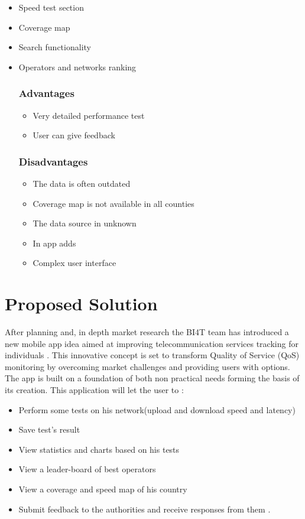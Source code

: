 \begin{itemize}
    \renewcommand\labelitemi{\textbf{\Huge .}}
    \item  Speed test section
    \item Coverage map 
    \item Search functionality 
    \item Operators and networks ranking
  
\subsubsection*{Advantages}
\begin{itemize}
\renewcommand\labelitemi{\textbf{\Huge .}}
    \item Very detailed performance test
    \item User can give feedback
\end{itemize} 

\subsubsection*{Disadvantages}
\begin{itemize}
\renewcommand\labelitemi{\textbf{\Huge .}}
    \item The data is often outdated  
    \item Coverage map is not available in all counties 
    \item The data source in unknown
    \item In app adds 
    \item Complex user interface
\end{itemize} 
\end{itemize}

\section{Proposed Solution}
After planning and, in depth market research the BI4T team has introduced a new mobile app idea aimed at improving telecommunication services tracking  for individuals . This innovative concept is set to transform Quality of Service (QoS) monitoring by overcoming market challenges and providing users with options. The app is built on a foundation of both non practical needs forming the basis of its creation.
This application will let the user to :
\begin{itemize}
\renewcommand\labelitemi{\textbf{\Huge .}}
    \item Perform some tests on his network(upload and download speed and latency)  
    \item Save test's result 
    \item View  statistics and charts based on his tests
    \item View a leader-board of  best operators 
    \item View a coverage and speed map of his country
    \item Submit  feedback to the authorities and receive responses from them .
\end{itemize} 



